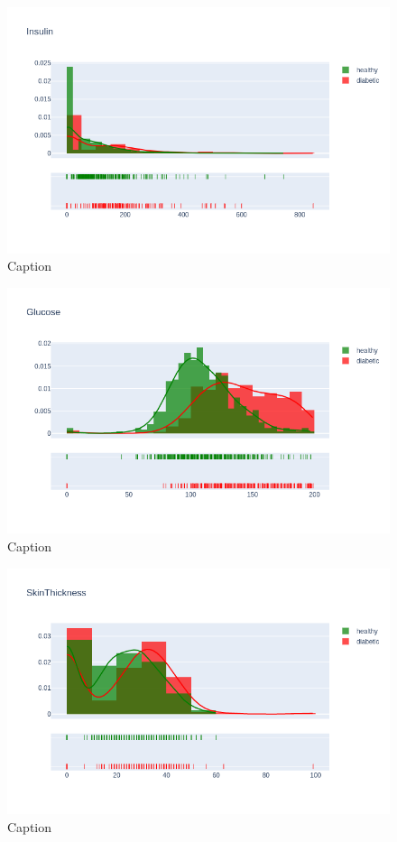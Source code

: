 \documentclass[12pt]{article}
\begin{document}
\begin{figure}[ht]
\centering
\includegraphics[width=1\textwidth]{6.png}
\caption{\label{fig:14} Caption}
\end{figure}

\begin{figure}[ht]
\centering
\includegraphics[width=1\textwidth]{7.png}
\caption{\label{fig:15} Caption}
\end{figure}

\begin{figure}[ht]
\centering
\includegraphics[width=1\textwidth]{8.png}
\caption{\label{fig:16} Caption}
\end{figure}
\end{document}
